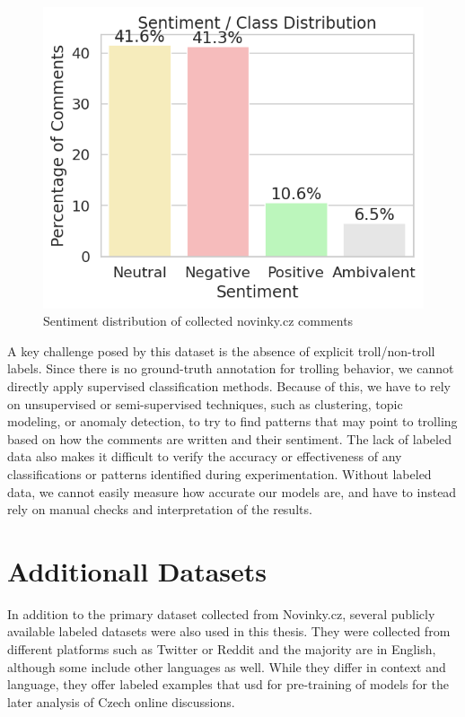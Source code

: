 \documentclass[twoside]{ctuthesis}
\theoremstyle{plain}
\theoremstyle{definition}
\theoremstyle{note}
\begin{document}
\begin{figure}[htbp]          
	\centering                 
	\includegraphics[scale=0.7]{figures/sentiment.png}
	\caption{Sentiment distribution of collected novinky.cz comments}    
	\label{fig:myplot}          
\end{figure}

A key challenge posed by this dataset is the absence of explicit troll/non-troll labels. Since there is no ground-truth annotation for trolling behavior, we cannot directly apply supervised classification methods. Because of this, we have to rely on unsupervised or semi-supervised techniques, such as clustering, topic modeling, or anomaly detection, to try to find patterns that may point to trolling based on how the comments are written and their sentiment. The lack of labeled data also makes it difficult to verify the accuracy or effectiveness of any classifications or patterns identified during experimentation. Without labeled data, we cannot easily measure how accurate our models are, and have to instead rely on manual checks and interpretation of the results.\par

\section{Additionall Datasets}

In addition to the primary dataset collected from Novinky.cz, several publicly available labeled datasets were also used in this thesis. They were collected from different platforms such as Twitter or Reddit and the majority are in English, although some include other languages as well. While they differ in context and language, they offer labeled examples that usd for pre-training of models for the later analysis of Czech online discussions.\par
\end{document}

